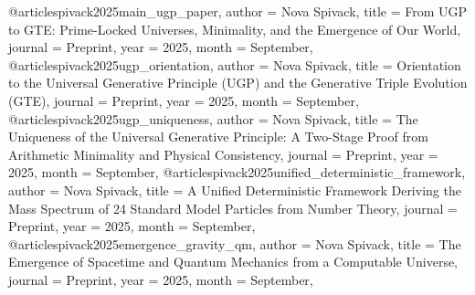 @article{spivack2025main_ugp_paper,
author = {Nova Spivack},
title = {From UGP to GTE: Prime-Locked Universes, Minimality, and the Emergence of Our World},
journal = {Preprint},
year = {2025},
month = {September},
}
@article{spivack2025ugp_orientation,
author = {Nova Spivack},
title = {Orientation to the Universal Generative Principle (UGP) and the Generative Triple Evolution (GTE)},
journal = {Preprint},
year = {2025},
month = {September},
}
@article{spivack2025ugp_uniqueness,
author = {Nova Spivack},
title = {The Uniqueness of the Universal Generative Principle: A Two-Stage Proof from Arithmetic Minimality and Physical Consistency},
journal = {Preprint},
year = {2025},
month = {September},
}
@article{spivack2025unified_deterministic_framework,
author = {Nova Spivack},
title = {A Unified Deterministic Framework Deriving the Mass Spectrum of 24 Standard Model Particles from Number Theory},
journal = {Preprint},
year = {2025},
month = {September},
}
@article{spivack2025emergence_gravity_qm,
author = {Nova Spivack},
title = {The Emergence of Spacetime and Quantum Mechanics from a Computable Universe},
journal = {Preprint},
year = {2025},
month = {September},
}